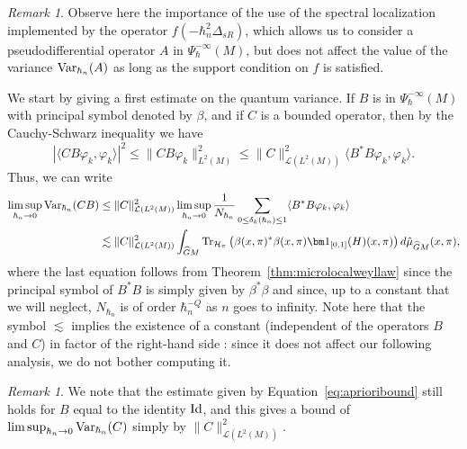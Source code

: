 \documentclass[12pt,a4paper]{amsart}
\theoremstyle{plain}
\theoremstyle{definition}
\theoremstyle{remark}
\newtheorem{remark}[theorem]{Remark}
\numberwithin{equation}{section}
\theoremstyle{definition}
\def \Ghat{\widehat{G}}
\numberwithin{equation}{section}
\begin{document}
\begin{remark}
    Observe here the importance of the use of the spectral localization implemented by the operator $f(-\hbar_n^2\Delta_{sR})$, which allows us to consider a pseudodifferential operator $A$ in $\Psi_\hbar^{-\infty}(M)$, but does not affect the value of the variance ${\rm Var}_{\hbar_n}(A)$ as long as the support condition on $f$ is satisfied.
\end{remark}
    
We start by giving a first estimate on the quantum variance. If $B$ is in $\Psi_\hbar^{-\infty}(M)$ with principal symbol denoted by $\beta$, and if $C$ is a bounded operator, then by the Cauchy-Schwarz inequality we have
\begin{equation*}
    \left|\langle C B\varphi_k,\varphi_k\rangle\right|^2\leq \|C B\varphi_k\|_{L^2(M)}^2\leq \|C\|_{\mathcal{L}(L^2(M))}^2\langle B^*B\varphi_k,\varphi_k\rangle.
\end{equation*}
Thus, we can write
\begin{equation}
    \label{eq:aprioribound}
    \begin{aligned}
        \limsup_{\hbar_n\rightarrow 0} {\rm Var}_{\hbar_n}(C B) 
        &\leq \|C\|_{\mathcal{L}(L^2(M))}^2\limsup_{\hbar_n\rightarrow 0}\frac{1}{N_{\hbar_n}}\sum_{0\leq \delta_k(\hbar_n)\leq 1}\langle B^*B\varphi_k,\varphi_k\rangle\\
        &\lesssim \|C\|_{\mathcal{L}(L^2(M))}^2\int_{\Ghat M}{\rm Tr}_{\mathcal{H}_\pi}\left(\beta(x,\pi)^*\beta(x,\pi){\bm 1}_{[0,1]}(H)(x,\pi)\right)d\hat{\mu}_{\Ghat M}(x,\pi),
    \end{aligned}
\end{equation}
where the last equation follows from Theorem~\ref{thm:microlocalweyllaw} since the principal symbol of $B^* B$ is simply given by $\beta^*\beta$ and since, up to a constant that we will neglect, $N_{\hbar_n}$ is of order $\hbar_n^{-Q}$ as $n$ goes to infinity. Note here that the symbol $\lesssim$ implies the existence of a constant (independent of the operators $B$ and $C$) in factor of the right-hand side : since it does not affect our following analysis, we do not bother computing it. 

\begin{remark}
    We note that the estimate given by Equation~\eqref{eq:aprioribound} still holds for $B$ equal to the identity ${\rm Id}$, and this gives a bound of $\limsup_{\hbar_n\rightarrow 0} {\rm Var}_{\hbar_n}(C)$ simply by $\|C\|_{\mathcal{L}(L^2(M))}^2$.
\end{remark}
\end{document}

